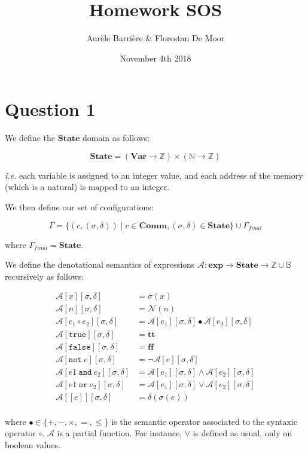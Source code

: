 \documentclass{article}
\title{Homework SOS}
\author{Aur\`ele Barri\`ere \& Florestan De Moor}
\date{November 4th 2018}
\newcommand{\var}{\mathbf{Var}}
\newcommand{\state}{\mathbf{State}}
\newcommand{\comm}{\mathbf{Comm}}
\newcommand{\A}{\mathcal{A}}
\newcommand{\Aa}[2]{\mathcal{A}\left[#1\right]\left[#2\right]}
\newcommand{\N}{\mathcal{N}}
\newcommand{\true}{\mathbf{tt}}
\newcommand{\false}{\mathbf{ff}}
\newcommand{\expr}{\mathbf{exp}}
\newcommand{\ie}{\emph{i.e.}}
\begin{document}
\maketitle

\section*{Question 1}


We define the $\state{}$ domain as follows:

\[
\state{} = \left(\var{}  \longrightarrow \mathbb{Z} \right) \times \left( \mathbb{N} \longrightarrow \mathbb{Z} \right)
\]

\ie{} each variable is assigned to an integer value, and each address of the memory (which is a natural) is mapped to an integer.

We then define our set of configurations:

\[
\Gamma = \lbrace \left( c, (\sigma, \delta) \right) \mid c \in \comm{}, (\sigma, \delta) \in \state{} \rbrace \cup \Gamma_{final}
\]

where $\Gamma_{final} = \state{}$.

We define the denotational semantics of expressions $\A{}: \expr{} \longrightarrow \state{} \longrightarrow \mathbb{Z} \cup \mathbb{B}$ recursively as follows:

\begin{align*}
	\Aa{x}{\sigma, \delta} &= \sigma(x) \\
	\Aa{n}{\sigma, \delta} &= \N(n) \\
	\Aa{e_1 \circ e_2}{\sigma, \delta} &= \Aa{e_1}{\sigma, \delta} \bullet \Aa{e_2}{\sigma, \delta} \\
	\Aa{\texttt{true}}{\sigma, \delta} &= \true{} \\
	\Aa{\texttt{false}}{\sigma, \delta} &= \false{} \\
	\Aa{\texttt{not}~e}{\sigma, \delta} &= \neg \Aa{e}{\sigma, \delta} \\
	\Aa{e1~\texttt{and}~e_2}{\sigma, \delta} &= \Aa{e_1}{\sigma, \delta} \wedge \Aa{e_2}{\sigma, \delta} \\
	\Aa{e1~\texttt{or}~e_2}{\sigma, \delta} &= \Aa{e_1}{\sigma, \delta} \vee \Aa{e_2}{\sigma, \delta} \\
	\Aa{[e]}{\sigma, \delta} &= \delta(\sigma(e)) \\
\end{align*}

where $\bullet \in \lbrace +, -, \times, =, \leq \rbrace$ is the semantic operator associated to the syntaxic operator $\circ$. $\A{}$ is a partial function. For instance, $\vee$ is defined as usual, only on boolean values.
\end{document}
